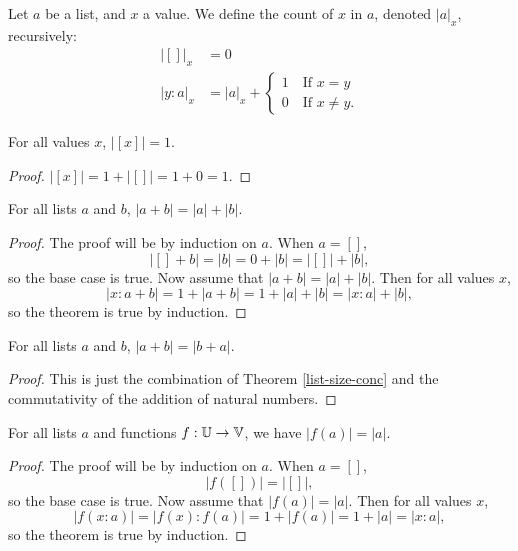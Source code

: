 \documentclass[../math.tex]{subfiles}
\begin{document}
\begin{definition}
    Let $a$ be a list, and $x$ a value.  We define the count of $x$ in $a$,
    denoted $|a|_x$, recursively:
    \begin{align*}
           |[]|_x &= 0 \\
        |y : a|_x &= |a|_x + \begin{cases}
            1 \quad \text{If $x = y$} \\
            0 \quad \text{If $x \neq y$}.
        \end{cases}
    \end{align*}
\end{definition}

\begin{theorem}
    For all values $x$, $|[x]| = 1$.
\end{theorem}
\begin{proof}
    $|[x]| = 1 + |[]| = 1 + 0 = 1$.
\end{proof}

\begin{theorem} \label{list-size-conc}
    For all lists $a$ and $b$, $|a + b| = |a| + |b|$.
\end{theorem}
\begin{proof}
    The proof will be by induction on $a$.  When $a = []$,
    \[
        |[] + b| = |b| = 0 + |b| = |[]| + |b|,
    \]
    so the base case is true.  Now assume that $|a + b| = |a| + |b|$.  Then for
    all values $x$,
    \[
        |x : a + b| = 1 + |a + b| = 1 + |a| + |b| = |x : a| + |b|,
    \]
    so the theorem is true by induction.
\end{proof}

\begin{theorem} \label{list-size-comm}
    For all lists $a$ and $b$, $|a + b| = |b + a|$.
\end{theorem}
\begin{proof}
    This is just the combination of Theorem \ref{list-size-conc} and the
    commutativity of the addition of natural numbers.
\end{proof}

\begin{theorem} \label{list-image-size}
    For all lists $a$ and functions $f : \mathbb{U} \to \mathbb{V}$, we have $|f(a)| = |a|$.
\end{theorem}
\begin{proof}
    The proof will be by induction on $a$.  When $a = []$,
    \[
        |f([])| = |[]|,
    \]
    so the base case is true.  Now assume that $|f(a)| = |a|$.  Then for all
    values $x$,
    \[
        |f(x : a)| = |f(x) : f(a)| = 1 + |f(a)| = 1 + |a| = |x : a|,
    \]
    so the theorem is true by induction.
\end{proof}
\end{document}
